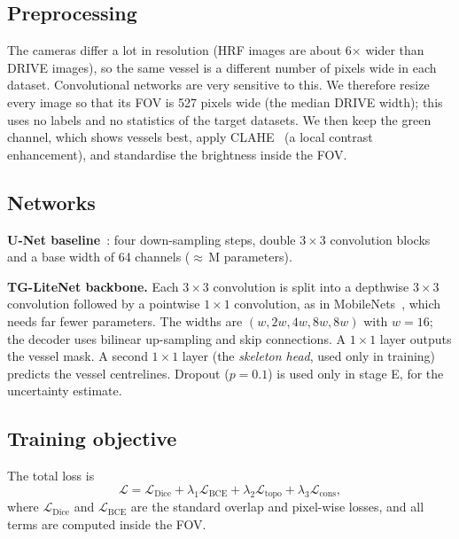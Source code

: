 \documentclass[conference]{IEEEtran}
\begin{document}
\subsection{Preprocessing}
The cameras differ a lot in resolution (HRF images are about 6$\times$ wider than DRIVE images), so the same vessel is a different number of pixels wide in each dataset. Convolutional networks are very sensitive to this. We therefore resize every image so that its FOV is 527 pixels wide (the median DRIVE width); this uses no labels and no statistics of the target datasets. We then keep the green channel, which shows vessels best, apply CLAHE~\cite{zuiderveld1994} (a local contrast enhancement), and standardise the brightness inside the FOV.
\subsection{Networks}
\textbf{U-Net baseline}~\cite{ronneberger2015}: four down-sampling steps, double $3{\times}3$ convolution blocks and a base width of 64 channels ($\approx$\paramsA\,M parameters).

\textbf{TG-LiteNet backbone.} Each $3{\times}3$ convolution is split into a depthwise $3{\times}3$ convolution followed by a pointwise $1{\times}1$ convolution, as in MobileNets~\cite{howard2017}, which needs far fewer parameters. The widths are $(w,2w,4w,8w,8w)$ with $w{=}16$; the decoder uses bilinear up-sampling and skip connections. A $1{\times}1$ layer outputs the vessel mask. A second $1{\times}1$ layer (the \emph{skeleton head}, used only in training) predicts the vessel centrelines. Dropout ($p{=}0.1$) is used only in stage E, for the uncertainty estimate.

\subsection{Training objective}
The total loss is
\begin{equation}
\mathcal L=\mathcal L_{\mathrm{Dice}}+\lambda_1\mathcal L_{\mathrm{BCE}}+\lambda_2\mathcal L_{\mathrm{topo}}+\lambda_3\mathcal L_{\mathrm{cons}},
\label{eq:loss}
\end{equation}
where $\mathcal L_{\mathrm{Dice}}$ and $\mathcal L_{\mathrm{BCE}}$ are the standard overlap and pixel-wise losses, and all terms are computed inside the FOV.
\end{document}
